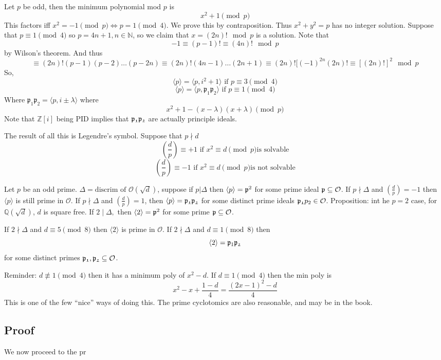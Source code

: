 \documentclass{article}
\begin{document}
Let $p$ be odd, then the minimum polynomial mod $p$ is
\[ x^2 + 1 \pmod{p} \]
This factors iff $x^2 = -1 \pmod{p} \iff p = 1 \pmod{4}$. We prove this by
contraposition. Thus $x^2 + y^2 = p$ has no integer solution. Suppose that $p \equiv 1
\pmod{4}$ so $p=4n+1, n \in \mathbb{N}$, so we claim that $x = (2n)! \mod{p}$ is
a solution. Note that
\[ -1 \equiv (p-1)! \equiv (4n)! \mod p \]
by Wilson's theorem. And thus
\[ \equiv (2n)!(p-1)(p-2)\ldots(p-2n) \equiv (2n)! (4n-1)\ldots(2n+1) \equiv
(2n)! [(-1)^{2n} (2n)! \equiv [(2n)!]^2 \mod p \]
So, 
\[ \langle p \rangle = \langle p, i^2 + 1 \rangle \text{ if } p \equiv 3
\pmod{4} \]
\[ \langle p \rangle = \langle p, \mathfrak{p_1p_2} \rangle \text{ if } p \equiv 1
\pmod{4} \]
Where $\mathfrak{p_1p_2} = \langle p, i \pm \lambda \rangle$ where
\[ x^2 + 1 - (x-\lambda)(x+\lambda) \pmod{p} \]
Note that $\mathbb{Z}[i]$ being PID implies that $\frak{p_1p_2}$ are actually
principle ideals. 

The result of all this is Legendre's symbol. Suppose that $p \nmid d$
\[ \left( \frac{d}{p} \right) \equiv +1 \text{ if } x^2 \equiv d \pmod{p} \text{is
solvable} \]
\[ \left( \frac{d}{p} \right) \equiv -1 \text{ if } x^2 \equiv d \pmod{p} \text{is
not solvable} \]

Let $p$ be an odd prime. $\Delta = \text{discrim of } \mathcal{O}(\sqrt{d})$,
suppose  if $p | \Delta$ then $\langle p \rangle = \frak{p}^2$ for some prime
ideal $\frak{p} \subseteq \mathcal{O}$. If $p\nmid \Delta$ and $\left(
\frac{d}{p}\right) = -1$ then $\langle p \rangle$ is still prime in
$\mathcal{O}$. If $p\nmid \Delta$ and $\left(\frac{d}{p} \right) = 1$, then
$\langle p \rangle = \frak{p_1p_2}$ for some distinct prime ideals
$\frak{p_1}{p_2} \in \mathcal{O}$. Proposition: int he $p = 2$ case, for
$\mathbb{Q}(\sqrt{d})$, $d$ is square free. If $2 \mid \Delta,$ then $\langle 2
\rangle = \frak{p}^2$ for some prime $\frak{p} \subseteq \mathcal{O}$. 

If $2 \nmid \Delta$ and $d \equiv 5 \pmod{8}$ then $\langle 2 \rangle$ is prime
in $\mathcal{O}$. If $2 \nmid \Delta$ and $d \equiv 1 \pmod{8}$ then
\[ \langle 2 \rangle = \frak{p}_1 \frak{p_2} \]
for some distinct primes $\frak{p_1,p_2} \subseteq \mathcal{O}$. 

Reminder: $d\not \equiv 1 \pmod{4}$ then it has a minimum poly of $x^2 - d$. If
$d \equiv 1 \pmod{4}$ then the min poly is 
\[ x^2 -x + \frac{1-d}{4} = \frac{(2x-1)^2-d}{4} \]
This is one of the few ``nice'' ways of doing this. The prime cyclotomics are
also reasonable, and may be in the book. 

\subsection{Proof}

We now proceed to the pr
\end{document}
